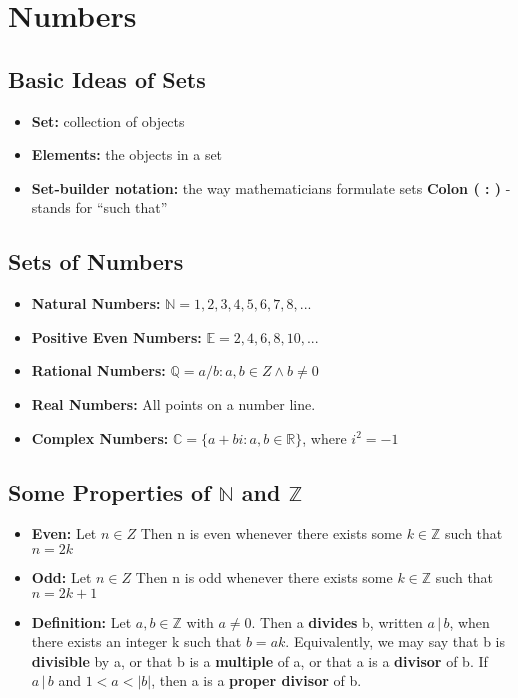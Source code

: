 \documentclass{report}
\begin{document}
\chapter{Numbers}
	\section{Basic Ideas of Sets}
		\begin{itemize}\addtolength{\leftskip}{2em}
			\item \textbf{Set:} collection of objects
			\item \textbf{Elements:} the objects in a set
			\item \textbf{Set-builder notation:} the way mathematicians formulate sets
				\subsubitem\textbf{ Colon ( : )} - stands for “such that”
		\end{itemize}
	\section{Sets of Numbers}
		\begin{itemize}\addtolength{\leftskip}{2em}
			\item \textbf{Natural Numbers:} $\mathbb{N}={1,2,3,4,5,6,7,8,...}$
			\item \textbf{Positive Even Numbers:} $\mathbb{E}={2,4,6,8,10,...}$
			\item \textbf{Rational Numbers:} $\mathbb{Q}={a/b:a,b\in Z\wedge b\ne 0}$
			\item \textbf{Real Numbers:} All points on a number line.
			\item \textbf{Complex Numbers:} $\mathbb{C}=\{a+bi:a,b\in\mathbb{R}\}$, where $i^2=-1$
		\end{itemize}
	\section{Some Properties of $\mathbb{N}$ and $\mathbb{Z}$}
		\begin{itemize}
			\item \textbf{Even:} Let $n\in Z$ Then n is even whenever there exists some $k\in \mathbb{Z}$ such that $n=2k$
			\item \textbf{Odd:} Let $n\in Z$ Then n is odd whenever there exists some $k\in \mathbb{Z}$ such that $n=2k+1$
			\item \textbf{Definition:} Let $a,b\in \mathbb{Z}$ with $a\ne 0$. Then a \textbf{divides} b, written $a\,|\,b$, when there exists an integer k such that $b=ak$. Equivalently, we may say that b is \textbf{divisible} by a, or that b is a \textbf{multiple} of a, or that a is a \textbf{divisor} of b. If $a\,|\,b$ and $1<a<|b|$, then a is a \textbf{proper divisor} of b.
		\end{itemize}
\end{document}
